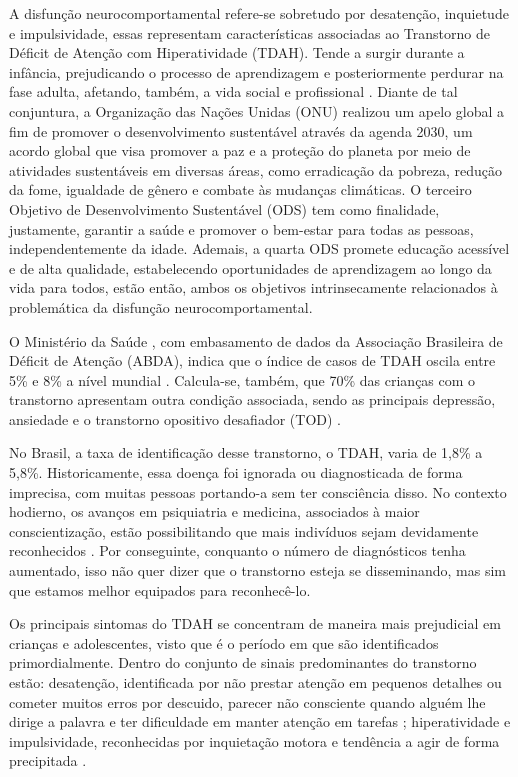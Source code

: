A disfunção neurocomportamental refere-se sobretudo por desatenção, inquietude e impulsividade, essas representam características associadas ao Transtorno de Déficit de Atenção com Hiperatividade (TDAH). Tende a surgir durante a infância, prejudicando o processo de aprendizagem e posteriormente perdurar na fase adulta, afetando, também, a vida social e profissional \cite{Einstein2024}. Diante de tal conjuntura, a Organização das Nações Unidas (ONU) realizou um apelo global a fim de promover o desenvolvimento sustentável através da agenda 2030, um acordo global que visa promover a paz e a proteção do planeta por meio de atividades sustentáveis em diversas áreas, como erradicação da pobreza, redução da fome, igualdade de gênero e combate às mudanças climáticas. O terceiro Objetivo de Desenvolvimento Sustentável (ODS) tem como finalidade, justamente, garantir a saúde e promover o bem-estar para todas as pessoas, independentemente da idade. Ademais, a quarta ODS promete educação acessível e de alta qualidade, estabelecendo oportunidades de aprendizagem ao longo da vida para todos, estão então, ambos os objetivos intrinsecamente relacionados à problemática da disfunção neurocomportamental.

O Ministério da Saúde , com embasamento de dados da Associação Brasileira de Déficit de Atenção (ABDA), indica que o índice de casos de TDAH oscila entre 5\% e 8\% a nível mundial \cite{Brasil2022}. Calcula-se, também, que 70\% das crianças com o transtorno apresentam outra condição associada, sendo as principais depressão, ansiedade e o transtorno opositivo desafiador (TOD) \cite{Zolin2024}.

No Brasil, a taxa de identificação desse transtorno, o TDAH, varia de 1,8\% a 5,8\%. Historicamente, essa doença foi ignorada ou diagnosticada de forma imprecisa, com muitas pessoas portando-a sem ter consciência disso. No contexto hodierno, os avanços em psiquiatria e medicina, associados à maior conscientização, estão possibilitando que mais indivíduos sejam devidamente reconhecidos \cite{Senado2023}. Por conseguinte, conquanto o número de diagnósticos tenha aumentado, isso não quer dizer que o transtorno esteja se disseminando, mas sim que estamos melhor equipados para reconhecê-lo.

Os principais sintomas do TDAH se concentram de maneira mais prejudicial em crianças e adolescentes, visto que é o período em que são identificados primordialmente. Dentro do conjunto de sinais predominantes do transtorno estão: desatenção, identificada por não prestar atenção em pequenos detalhes ou cometer muitos erros por descuido, parecer não consciente quando alguém lhe dirige a palavra e ter dificuldade em manter atenção em tarefas \cite{PequenoPrincipe2023}; hiperatividade e impulsividade, reconhecidas por inquietação motora e tendência a agir de forma precipitada \cite{PequenoPrincipe2023}.

